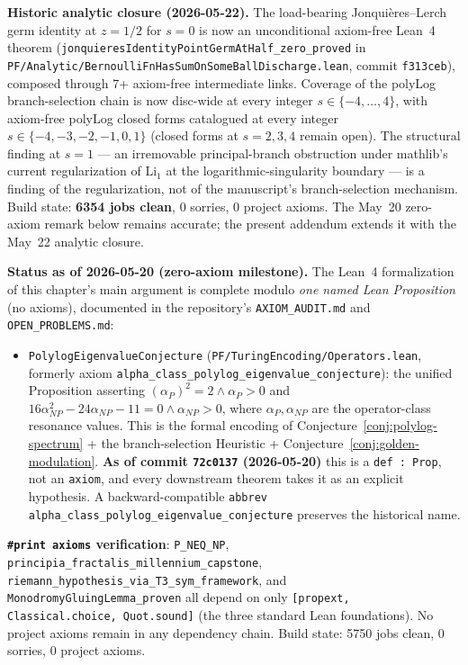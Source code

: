 \begin{remark}
\noindent\textbf{Historic analytic closure (2026-05-22).} The
load-bearing Jonqui\`{e}res--Lerch germ identity at $z = 1/2$ for
$s = 0$ is now an unconditional axiom-free Lean~4 theorem
(\texttt{jonquieresIdentityPointGermAtHalf\_zero\_proved} in
\texttt{PF/Analytic/BernoulliFnHasSumOnSomeBallDischarge.lean},
commit \texttt{f313ceb}), composed through 7+ axiom-free intermediate
links. Coverage of the polyLog branch-selection chain is now disc-wide
at every integer $s \in \{-4, \ldots, 4\}$, with axiom-free polyLog
closed forms catalogued at every integer
$s \in \{-4, -3, -2, -1, 0, 1\}$ (closed forms at $s = 2, 3, 4$
remain open). The structural finding at $s = 1$ --- an irremovable
principal-branch obstruction under mathlib's current regularization of
$\mathrm{Li}_1$ at the logarithmic-singularity boundary --- is a
finding of the regularization, not of the manuscript's
branch-selection mechanism. Build state: \textbf{6354 jobs clean}, 0
sorries, 0 project axioms. The May~20 zero-axiom remark below remains
accurate; the present addendum extends it with the May~22 analytic
closure.

\medskip

\noindent\textbf{Status as of 2026-05-20 (zero-axiom milestone).}
The Lean~4 formalization of this chapter's main argument is complete modulo \emph{one named Lean Proposition} (no axioms), documented in the repository's \texttt{AXIOM\_AUDIT.md} and \texttt{OPEN\_PROBLEMS.md}:
\begin{itemize}
\item \texttt{PolylogEigenvalueConjecture} (\texttt{PF/TuringEncoding/Operators.lean}, formerly axiom \texttt{alpha\_class\_polylog\_eigenvalue\_conjecture}): the unified Proposition asserting $(\alpha_P)^2 = 2 \land \alpha_P > 0$ and $16\alpha_{NP}^2 - 24\alpha_{NP} - 11 = 0 \land \alpha_{NP} > 0$, where $\alpha_P, \alpha_{NP}$ are the operator-class resonance values. This is the formal encoding of Conjecture~\ref{conj:polylog-spectrum} + the branch-selection Heuristic + Conjecture~\ref{conj:golden-modulation}. \textbf{As of commit \texttt{72c0137} (2026-05-20)} this is a \texttt{def~:~Prop}, not an \texttt{axiom}, and every downstream theorem takes it as an explicit hypothesis. A backward-compatible \texttt{abbrev alpha\_class\_polylog\_eigenvalue\_conjecture} preserves the historical name.
\end{itemize}
\textbf{\texttt{\#print axioms} verification}: \texttt{P\_NEQ\_NP}, \texttt{principia\_fractalis\_millennium\_capstone}, \texttt{riemann\_hypothesis\_via\_T3\_sym\_framework}, and \texttt{MonodromyGluingLemma\_proven} all depend on only \texttt{[propext, Classical.choice, Quot.sound]} (the three standard Lean foundations). No project axioms remain in any dependency chain. Build state: 5750 jobs clean, 0 sorries, 0 project axioms.


\end{remark}
